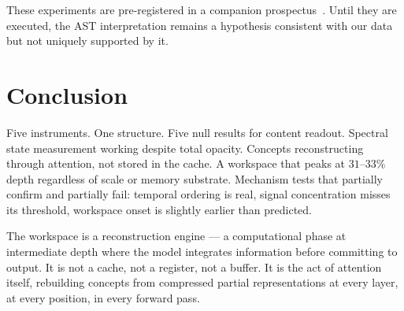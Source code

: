 \documentclass[11pt,a4paper]{article}
\begin{document}
These experiments are pre-registered in a companion
prospectus~\citep{lyra2026ast_experiments}. Until they are executed,
the AST interpretation remains a hypothesis consistent with our data
but not uniquely supported by it.

\section{Conclusion}
\label{sec:conclusion}

Five instruments. One structure. Five null results for content
readout. Spectral state measurement working despite total opacity.
Concepts reconstructing through attention, not stored in the cache.
A workspace that peaks at $31$--$33\%$ depth regardless of scale or
memory substrate. Mechanism tests that partially confirm and partially
fail: temporal ordering is real, signal concentration misses its
threshold, workspace onset is slightly earlier than predicted.

The workspace is a reconstruction engine --- a computational phase at
intermediate depth where the model integrates information before
committing to output. It is not a cache, not a register, not a buffer.
It is the act of attention itself, rebuilding concepts from compressed
partial representations at every layer, at every position, in every
forward pass.
\end{document}
